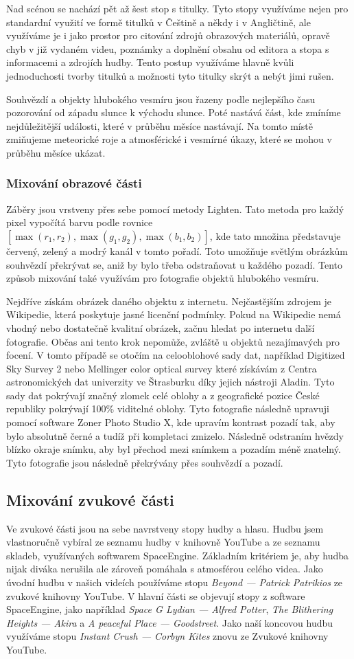 \documentclass[12pt,a4paper,titlepage]{article}
\begin{document}
Nad scénou se nachází pět až šest stop s titulky. Tyto stopy využíváme nejen pro standardní využití ve formě titulků v Češtině a někdy i v Angličtině, ale využíváme je i jako prostor pro citování zdrojů obrazových materiálů, opravě chyb v již vydaném videu, poznámky a doplnění obsahu od editora a stopa s informacemi a zdrojích hudby. Tento postup využíváme hlavně kvůli jednoduchosti tvorby titulků a možnosti tyto titulky skrýt a nebýt jimi rušen. 

Souhvězdí a objekty hlubokého vesmíru jsou řazeny podle nejlepšího času pozorování od západu slunce k východu slunce. Poté nastává část, kde zmíníme nejdůležitější události, které v průběhu měsíce nastávají. Na tomto místě zmiňujeme meteorické roje a atmosférické i vesmírné úkazy, které se mohou v průběhu měsíce ukázat.
\subsubsection{Mixování obrazové části}
Záběry jsou vrstveny přes sebe pomocí metody Lighten. Tato metoda pro každý pixel vypočítá barvu podle rovnice $[\max(r_1, r_2), \max(g_1, g_2), \max(b_1, b_2)]$, kde tato množina představuje červený, zelený a modrý kanál v tomto pořadí. Toto umožňuje světlým obrázkům souhvězdí překrývat se, aniž by bylo třeba odstraňovat u každého pozadí. Tento způsob mixování také využívám pro fotografie objektů hlubokého vesmíru. 

Nejdříve získám obrázek daného objektu z internetu. Nejčastějším zdrojem je Wikipedie, která poskytuje jasné licenční podmínky. Pokud na Wikipedie nemá vhodný nebo dostatečně kvalitní obrázek, začnu hledat po internetu další fotografie. Občas ani tento krok nepomůže, zvláště u objektů nezajímavých pro focení. V tomto případě se otočím na celooblohové sady dat, například Digitized Sky Survey 2 nebo Mellinger color optical survey které získávám z Centra astronomických dat univerzity ve Štrasburku díky jejich nástroji Aladin. Tyto sady dat pokrývají značný zlomek celé oblohy a z geografické pozice České republiky pokrývají 100\% viditelné oblohy. Tyto fotografie následně upravuji pomocí software Zoner Photo Studio X, kde upravím kontrast pozadí tak, aby bylo absolutně černé a tudíž při kompletaci zmizelo. Následně odstraním hvězdy blízko okraje snímku, aby byl přechod mezi snímkem a pozadím méně znatelný. Tyto fotografie jsou následně překrývány přes souhvězdí a pozadí. 
\subsection{Mixování zvukové části}
Ve zvukové části jsou na sebe navrstveny stopy hudby a hlasu. Hudbu jsem vlastnoručně vybíral ze seznamu hudby v knihovně YouTube a ze seznamu skladeb, využívaných softwarem SpaceEngine. Základním kritériem je, aby hudba nijak diváka nerušila ale zároveň pomáhala s atmosférou celého videa. Jako úvodní hudbu v našich videích používáme stopu \textit{Beyond --- Patrick Patrikios} ze zvukové knihovny YouTube. V hlavní části se objevují stopy z software SpaceEngine, jako například \textit{Space G Lydian --- Alfred Potter}, \textit{The Blithering Heights --- Akira} a \textit{A peaceful Place --- Goodstreet}. Jako naší koncovou hudbu využíváme stopu \textit{Instant Crush --- Corbyn Kites} znovu ze Zvukové knihovny YouTube.
\end{document}
